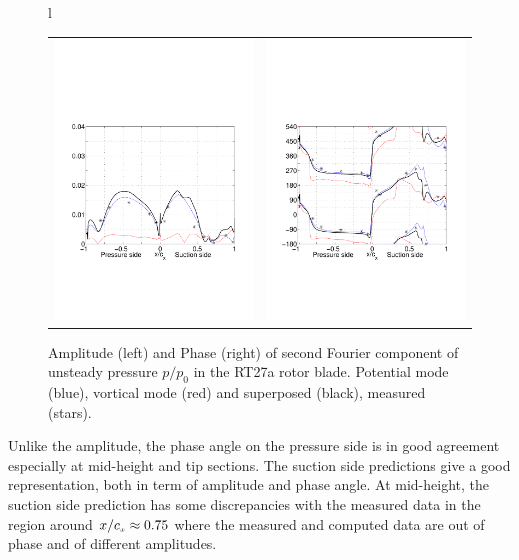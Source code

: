 \begin{figure}
\begin{flushleft}
\begin{tabular}{l}
{\begin{tabular}{ll}
        \hspace{-5mm}
        \includegraphics[width=70mm,clip=t]{CHAP_RT27/FIGURE/amps5m2.pdf}
         &
        \includegraphics[width=70mm,clip=t]{CHAP_RT27/FIGURE/phas5m2.pdf}
       \end{tabular}}
   \end{tabular}
  \end{flushleft}
  \vspace{-8mm}
  \caption{Amplitude (left) and Phase (right) of
           second Fourier component of unsteady pressure $p/p_0$
           in the RT27a rotor blade.
           Potential mode (blue), vortical mode (red) and
           superposed (black), measured (stars).}
  \label{rt27_unsteady3d_2.fig}
\end{figure}
%
%
 Unlike the amplitude, the phase angle on the pressure side is in
 good agreement especially at mid-height and tip sections.
 The suction side predictions give a good representation,
 both in term of amplitude and phase angle. At mid-height, the suction side
 prediction has some discrepancies with the measured data in the region
 around $x/c_{\mbox{\tiny $x$}}\approx 0.75$ where the measured and computed data are out of
 phase and of different amplitudes.

